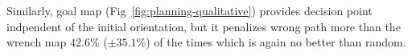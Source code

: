 Similarly, goal map (Fig~\ref{fig:planning-qualitative}) provides decision point indpendent of the initial orientation, but it penalizes wrong path more than the wrench map $42.6$\% ($\pm 35.1$\%) of the times which is again no better than random.
% 


